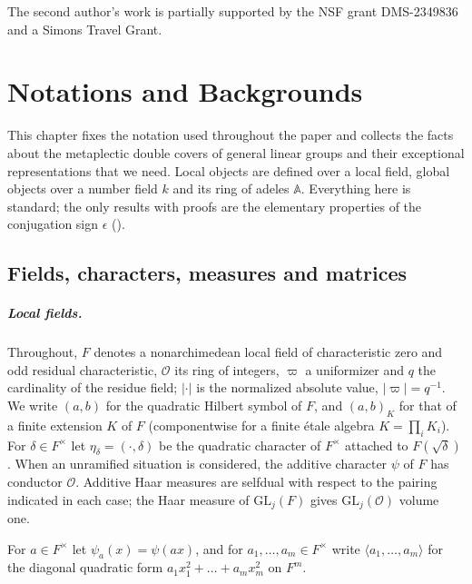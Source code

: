 \documentclass[11pt,oneside,notitlepage]{book}
\numberwithin{equation}{section}
\theoremstyle{plain}
\theoremstyle{definition}
\newcommand{\A}{\mathbb{A}}
\newcommand{\cO}{\mathcal{O}}
\newcommand{\GL}{\mathrm{GL}}
\newcommand{\hil}[2]{(#1,#2)}
\begin{document}
The second author’s work is partially supported by the NSF grant DMS-2349836 and a Simons Travel Grant.

\chapter{Notations and Backgrounds}\label{ch:notation}

This chapter fixes the notation used throughout the paper and collects the facts about the metaplectic double covers of general linear groups and their exceptional representations that we need. Local objects are defined over a local field, global objects over a number field $k$ and its ring of adeles $\A$. Everything here is standard; the only results with proofs are the elementary properties of the conjugation sign $\epsilon$ ().

\section{Fields, characters, measures and matrices}\label{sec:notation}

\paragraph{Local fields.}
Throughout, $F$ denotes a nonarchimedean local field of characteristic zero and odd residual characteristic, $\cO$ its ring of integers, $\varpi$ a uniformizer and $q$ the cardinality of the residue field; $|\cdot|$ is the normalized absolute value, $|\varpi|=q^{-1}$. We write $\hil ab$ for the quadratic Hilbert symbol of $F$, and $\hil ab_K$ for that of a finite extension $K$ of $F$ (componentwise for a finite \'etale algebra $K=\prod_iK_i$). For $\delta\in F^\times$ let $\eta_\delta=\hil{\cdot}{\delta}$ be the quadratic character of $F^\times$ attached to $F(\sqrt\delta)$. When an unramified situation is considered, the additive character $\psi$ of $F$ has conductor $\cO$. Additive Haar measures are selfdual with respect to the pairing indicated in each case; the Haar measure of $\GL_j(F)$ gives $\GL_j(\cO)$ volume one.

For $a\in F^\times$ let $\psi_a(x)=\psi(ax)$, and for $a_1,\dots,a_m\in F^\times$ write $\langle a_1,\dots,a_m\rangle$ for the diagonal quadratic form $a_1x_1^2+\dots+a_mx_m^2$ on $F^m$.
\end{document}
